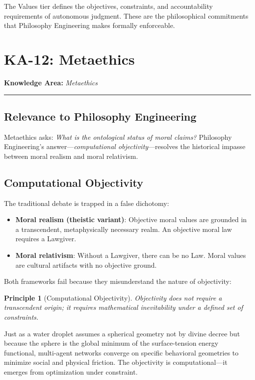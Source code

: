 \documentclass[12pt,letterpaper]{article}
\theoremstyle{definition}
\theoremstyle{plain}
\newtheorem{principle}[theorem]{Principle}
\newcommand{\ka}[1]{\vspace{1em}\noindent\textbf{\large Knowledge Area:} \textit{#1}\vspace{0.5em}\hrule\vspace{0.5em}}
\begin{document}
The Values tier defines the objectives, constraints, and accountability requirements of autonomous judgment. These are the philosophical commitments that Philosophy Engineering makes formally enforceable.

\section{KA-12: Metaethics}
\label{sec:ka12}

\ka{Metaethics}

\subsection{Relevance to Philosophy Engineering}

Metaethics asks: \emph{What is the ontological status of moral claims?} Philosophy Engineering's answer---\emph{computational objectivity}---resolves the historical impasse between moral realism and moral relativism.

\subsection{Computational Objectivity}

The traditional debate is trapped in a false dichotomy:
\begin{itemize}
    \item \textbf{Moral realism (theistic variant)}: Objective moral values are grounded in a transcendent, metaphysically necessary realm. An objective moral law requires a Lawgiver.
    \item \textbf{Moral relativism}: Without a Lawgiver, there can be no Law. Moral values are cultural artifacts with no objective ground.
\end{itemize}

Both frameworks fail because they misunderstand the nature of objectivity:

\begin{principle}[Computational Objectivity]
Objectivity does not require a transcendent origin; it requires mathematical inevitability under a defined set of constraints.
\end{principle}

Just as a water droplet assumes a spherical geometry not by divine decree but because the sphere is the global minimum of the surface-tension energy functional, multi-agent networks converge on specific behavioral geometries to minimize social and physical friction. The objectivity is computational---it emerges from optimization under constraint.
\end{document}
